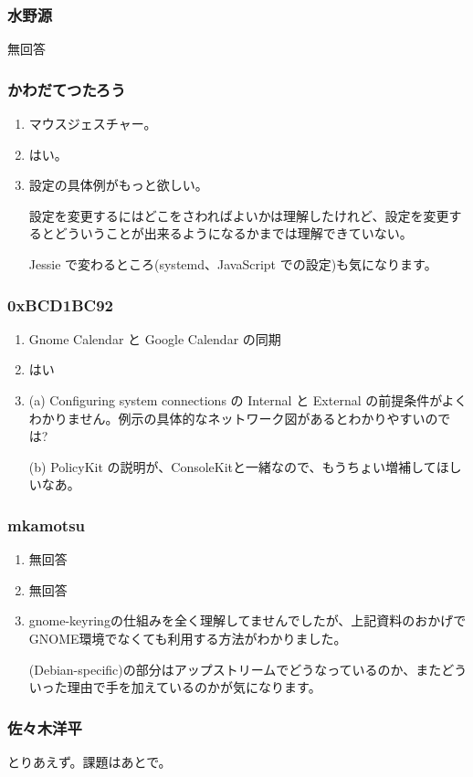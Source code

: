 \documentclass[cjk,dvipdfmx,10pt,compress,%
hyperref={bookmarks=true,bookmarksnumbered=true,bookmarksopen=false,%
colorlinks=false,%
pdftitle={第 70 回 関西 Debian 勉強会},%
pdfauthor={倉敷・のがた・佐々木・かわだ・八津尾},%
pdfsubject={資料},%
}]{beamer}
\begin{document}
\begin{frame}
  \frametitle{水野源}
  無回答
\end{frame}

\begin{frame}
  \frametitle{かわだてつたろう}
  \begin{enumerate}
  \item マウスジェスチャー。
  \item はい。
  \item 設定の具体例がもっと欲しい。

  設定を変更するにはどこをさわればよいかは理解したけれど、設定を変更するとどういうことが出来るようになるかまでは理解できていない。

  Jessie で変わるところ(systemd、JavaScript での設定)も気になります。
  \end{enumerate}
\end{frame}

\begin{frame}
  \frametitle{0xBCD1BC92}
  \begin{enumerate}
  \item Gnome Calendar と Google Calendar の同期
  \item はい
  \item (a) Configuring system connections の Internal と External の前提条件がよくわかりません。例示の具体的なネットワーク図があるとわかりやすいのでは?

    (b) PolicyKit の説明が、ConsoleKitと一緒なので、もうちょい増補してほしいなあ。 
  \end{enumerate}
\end{frame}

\begin{frame}
  \frametitle{mkamotsu}
  \begin{enumerate}
  \item 無回答
  \item 無回答
  \item gnome-keyringの仕組みを全く理解してませんでしたが、上記資料のおかげでGNOME環境でなくても利用する方法がわかりました。

    (Debian-specific)の部分はアップストリームでどうなっているのか、またどういった理由で手を加えているのかが気になります。
  \end{enumerate}
\end{frame}

\begin{frame}
  \frametitle{佐々木洋平}
  とりあえず。課題はあとで。
\end{frame}
\end{document}
